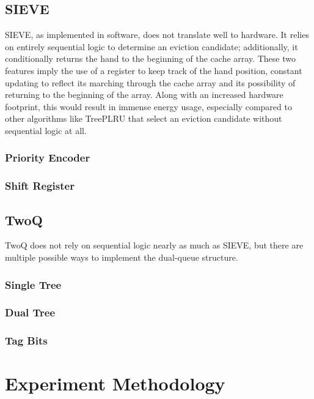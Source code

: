 \subsection{SIEVE}

SIEVE, as implemented in software, does not translate well to hardware.
It relies on entirely sequential logic to determine an eviction candidate;
additionally, it conditionally returns the hand to the beginning of the cache array.
These two features imply the use of a register to keep track of the hand position,
constant updating to reflect its marching through the cache array
and its possibility of returning to the beginning of the array.
Along with an increased hardware footprint, this would result in immense energy usage,
especially compared to other algorithms like TreePLRU that select an eviction candidate
without sequential logic at all.

\subsubsection{Priority Encoder}

\subsubsection{Shift Register}

\subsection{TwoQ}

TwoQ does not rely on sequential logic nearly as much as SIEVE,
but there are multiple possible ways to implement the dual-queue structure.

\subsubsection{Single Tree}

\subsubsection{Dual Tree}

\subsubsection{Tag Bits}

\section{Experiment Methodology}

